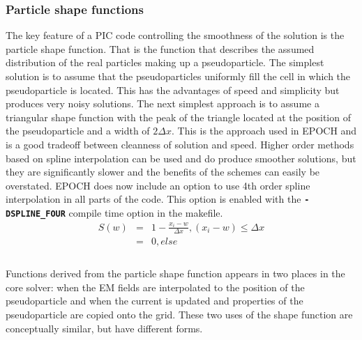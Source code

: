 \documentclass[12pt]{article}
\newcommand{\inlinecode}[1]{{\color{warwickred} \bf\texttt{#1}}}
\newcommand{\EPOCH}{{\color{warwickdark}\fontfamily{phv}\selectfont EPOCH} }
\begin{document}
\subsubsection{Particle shape functions}
The key feature of a PIC code controlling the smoothness of the solution is the
particle shape function. That is the function that describes the assumed
distribution of the real particles making up a pseudoparticle. The simplest
solution is to assume that the pseudoparticles uniformly fill the cell in which
the pseudoparticle is located. This has the advantages of speed and simplicity
but produces very noisy solutions. The next simplest approach is to assume a
triangular shape function with the peak of the triangle located at the position
of the pseudoparticle and a width of $ 2 \Delta x$. This is the approach used
in \EPOCH and is a good tradeoff between cleanness of solution and
speed. Higher order methods based on spline interpolation can be used and do
produce smoother solutions, but they are significantly slower and the benefits
of the schemes can easily be overstated. \EPOCH does now include an option to
use 4th order spline interpolation in all parts of the code. This option is
enabled with the \inlinecode{-DSPLINE\_FOUR} compile time option in the
makefile.\\
\begin{eqnarray*}
S(w)&=&1-\frac{x_i-w}{\Delta x}, (x_i-w) \le \Delta x\\
&=&0, else\\
\end{eqnarray*}
\\
Functions derived from the particle shape function appears in two places in the
core solver: when the EM fields are interpolated to the position of the
pseudoparticle and when the current is updated and properties of the
pseudoparticle are copied onto the grid. These two uses of the shape function
are conceptually similar, but have different forms.
\end{document}
